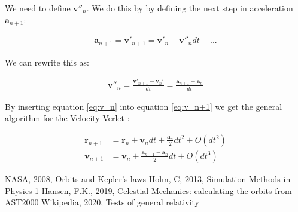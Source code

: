 \documentclass{article}
\begin{document}
We need to define $\mathbf{v}''_n$. We do this by by defining the next step in acceleration $\mathbf{a}_{n+1}$:

\begin{align*}
    \mathbf{a}_{n+1}=\mathbf{v}'_{n+1}=\mathbf{v}'_n+\mathbf{v}''_ndt + ...
\end{align*}

We can rewrite this as:

\begin{align}
        \mathbf{v}''_n=\frac{\mathbf{v}'_{n+1}-\mathbf{v}_n'}{dt}
    =\frac{\mathbf{a}_{n+1}-\mathbf{a}_n}{dt}
    \label{eq:v_n}
\end{align}

By inserting equation \ref{eq:v_n} into equation \ref{eq:v_n+1} we get the general algorithm for the Velocity Verlet \cite{95}:

\begin{align*}
    \mathbf{r}_{n+1}&=\mathbf{r}_n+\mathbf{v}_ndt+\frac{\mathbf{a}_n}{2}dt^2+O(dt^2)\\
    \mathbf{v}_{n+1}&=\mathbf{v}_n+\frac{\mathbf{a}_{n+1}-\mathbf{a}_n}{2}dt+O(dt^3)
\end{align*}

\begin{thebibliography}{9}
	NASA, 2008, Orbits and Kepler's laws
	Holm, C, 2013, Simulation Methods in Physics 1 
	Hansen, F.K., 2019, Celestial Mechanics: calculating the orbits from AST2000
	 Wikipedia, 2020, Tests of general relativity
\end{thebibliography}
\end{document}
